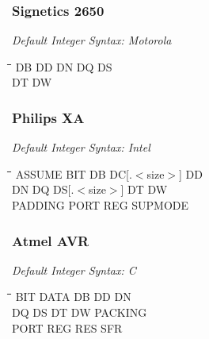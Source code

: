 \subsubsection{Signetics 2650}

{\em Default Integer Syntax: Motorola}

{\tt\begin{tabbing}
\hspace{3cm}\=\hspace{3cm}\=\hspace{3cm}\=\hspace{3cm}\=\kill
DB         \> DD          \> DN          \> DQ          \> DS \\
DT         \> DW          \\
\end{tabbing}}

\subsubsection{Philips XA}

{\em Default Integer Syntax: Intel}

{\tt\begin{tabbing}
\hspace{3cm}\=\hspace{3cm}\=\hspace{3cm}\=\hspace{3cm}\=\kill
ASSUME     \> BIT         \> DB          \> DC[.$<$size$>$] \> DD \\
DN         \> DQ          \> DS[.$<$size$>$] \> DT      \> DW \\
PADDING    \> PORT        \> REG         \> SUPMODE \\
\end{tabbing}}

\subsubsection{Atmel AVR}

{\em Default Integer Syntax: C}

{\tt\begin{tabbing}
\hspace{3cm}\=\hspace{3cm}\=\hspace{3cm}\=\hspace{3cm}\=\kill
BIT        \> DATA       \> DB          \> DD           \> DN \\
DQ         \> DS         \> DT          \> DW           \> PACKING \\
PORT       \> REG        \> RES         \> SFR \\
\end{tabbing}}

